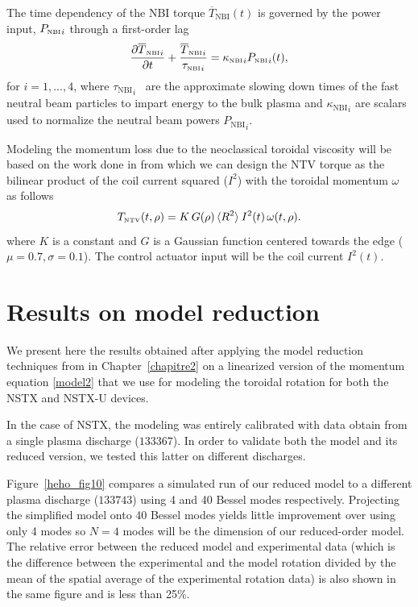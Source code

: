 \documentclass[12pt,lot, lof]{puthesis}
\begin{document}
The time dependency of the NBI torque $\overline{T}_\text{NBI}(t)$ is governed by the power input, $ {P_\textrm{\tiny{NBI}}}_i$ through a first-order lag
 \begin{equation}
\frac{{\partial \overline{T}_\textrm{\tiny{NBI}}}_i}{\partial t}
+ \frac{{\overline{T}_\textrm{\tiny{NBI}}}_i}{{\tau_\textrm{\tiny{NBI}}}_i}  = {\kappa_\textrm{\tiny{NBI}}}_i {P_\textrm{\tiny{NBI}}}_i(t), \label{model7}
\end{equation}
for $i=1,...,4$, where ${\tau_\text{NBI}}_i$ \, are the approximate slowing down times of the fast neutral beam particles to impart energy to the bulk plasma and ${\kappa_\text{NBI}}_i$ are scalars used to normalize the neutral beam powers ${P_\text{NBI}}_i$.

Modeling the momentum loss due to the neoclassical toroidal viscosity will be based on the work done in \cite{Zhu06} from which we can design the NTV torque as the bilinear product of the coil current squared ($I^2$) with the toroidal momentum $\omega$ as follows
\begin{equation}
T_\textrm{\tiny NTV}  (t, \rho) =   K \, G(\rho) \,  \langle R^2 \rangle \:  I^2(t) \,\omega (t, \rho) .
\label{model8}
\end{equation}
where $K$ is a constant and $G$ is a Gaussian function centered towards the edge ($\mu =0.7, \sigma =0.1$). The control actuator input will be the coil current $I^2(t)$.



\section{Results on model reduction}

We present here the results obtained after applying the model reduction techniques from in Chapter~\ref{chapitre2} on a linearized version of the momentum equation \eqref{model2} that we use for modeling the toroidal rotation for both the NSTX and NSTX-U devices.

In the case of NSTX, the modeling was entirely calibrated with data obtain from a single plasma discharge ($133367$). In order to validate both the model and its reduced version, we tested this latter on different discharges.

Figure~\ref{heho_fig10} compares a simulated run of our reduced model to a different plasma discharge ($133743$) using 4 and 40 Bessel modes respectively.
Projecting the simplified model onto 40 Bessel modes yields little improvement over using only 4 modes so $N=4$ modes will be the dimension of our reduced-order model.
The relative error between the reduced model and experimental data (which is the difference between the experimental and the model rotation divided by the mean of the spatial average of the experimental rotation data) is also shown in the same figure and is less than 25\%.
\end{document}

